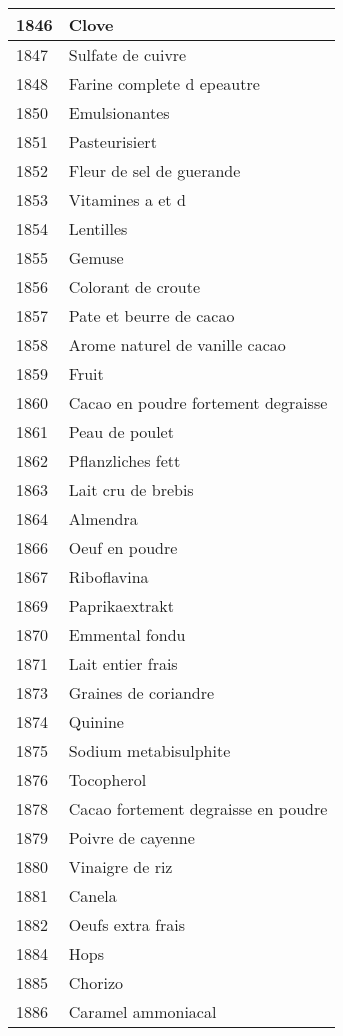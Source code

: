 \begin{longtable}{|l|l|}
1846 & Clove \\ \hline 
1847 & Sulfate de cuivre \\ \hline 
1848 & Farine complete d epeautre \\ \hline 
1850 & Emulsionantes \\ \hline 
1851 & Pasteurisiert \\ \hline 
1852 & Fleur de sel de guerande \\ \hline 
1853 & Vitamines a et d \\ \hline 
1854 & Lentilles \\ \hline 
1855 & Gemuse \\ \hline 
1856 & Colorant de croute \\ \hline 
1857 & Pate et beurre de cacao \\ \hline 
1858 & Arome naturel de vanille cacao \\ \hline 
1859 & Fruit \\ \hline 
1860 & Cacao en poudre fortement degraisse \\ \hline 
1861 & Peau de poulet \\ \hline 
1862 & Pflanzliches fett \\ \hline 
1863 & Lait cru de brebis \\ \hline 
1864 & Almendra \\ \hline 
1866 & Oeuf en poudre \\ \hline 
1867 & Riboflavina \\ \hline 
1869 & Paprikaextrakt \\ \hline 
1870 & Emmental fondu \\ \hline 
1871 & Lait entier frais \\ \hline 
1873 & Graines de coriandre \\ \hline 
1874 & Quinine \\ \hline 
1875 & Sodium metabisulphite \\ \hline 
1876 & Tocopherol \\ \hline 
1878 & Cacao fortement degraisse en poudre \\ \hline 
1879 & Poivre de cayenne \\ \hline 
1880 & Vinaigre de riz \\ \hline 
1881 & Canela \\ \hline 
1882 & Oeufs extra frais \\ \hline 
1884 & Hops \\ \hline 
1885 & Chorizo \\ \hline 
1886 & Caramel ammoniacal \\ \hline 

\end{longtable}
